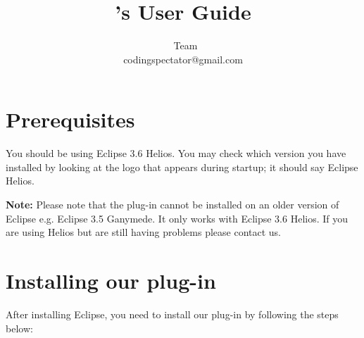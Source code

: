 \documentclass{article}
\title{\codspec's User Guide}
\author{\codspec\ Team\\codingspectator@gmail.com}
\newcommand\warnnote[1]{\textbf{Note: }#1}
\begin{document}
%
\maketitle
%
\tableofcontents
%
\section{Prerequisites}
%
You should be using Eclipse 3.6 Helios. You may check which version you have
installed by looking at the logo that appears during startup; it should say
Eclipse Helios.

\warnnote{Please note that the plug-in cannot be installed on an older version
of Eclipse e.g. Eclipse 3.5 Ganymede. It only works with Eclipse 3.6 Helios. If
you are using Helios but are still having problems please contact us.}
%
\section{Installing our plug-in}

After installing Eclipse, you need to install our plug-in by following the steps
below:
\end{document}
